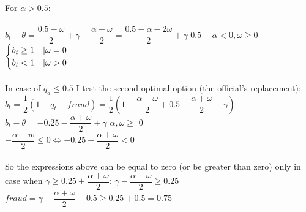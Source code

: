 \documentclass[a4paper, 12pt]{article}
\begin{document}
    For $\alpha > 0.5$:\\\\
    $b_t - \theta = \dfrac{0.5 - \omega}{2} +\gamma - \dfrac{\alpha+\omega}{2} = \dfrac{0.5 - \alpha - 2\omega}{2} +\gamma $ \textbar $0.5 - \alpha < 0, \omega \geq 0$\\
    $\begin{cases}
        b_t \geq 1 & \textbar \omega = 0\\
        b_t < 1 & \textbar \omega > 0
    \end{cases}$\\\\
    In case of $q_a \leq 0.5$ I test the second optimal option (the official's replacement):\\
    $b_t = \dfrac{1}{2}(1 - q_t + fraud) = \dfrac{1}{2}(1 - \dfrac{\alpha + \omega}{2} + 0.5 - \dfrac{\alpha+\omega}{2}+\gamma)$\\
    $b_t - \theta = -0.25 - \dfrac{\alpha+\omega}{2} +\gamma$ \textbar $\alpha, \omega \geq$ 0 \\
    $-\dfrac{\alpha + w}{2} \leq 0 \Leftrightarrow -0.25 - \dfrac{\alpha + \omega}{2} < 0$\\\\
    So the expressions above can be equal to zero (or be greater than zero) only in case when $\gamma \geq 0.25 + \dfrac{\alpha+\omega}{2}$: $\gamma - \dfrac{\alpha+\omega}{2} \geq 0.25$\\
    $fraud = \gamma - \dfrac{\alpha+\omega}{2} +0.5 \geq 0.25 + 0.5 = 0.75$
    
        \newpage
    
\end{document}
